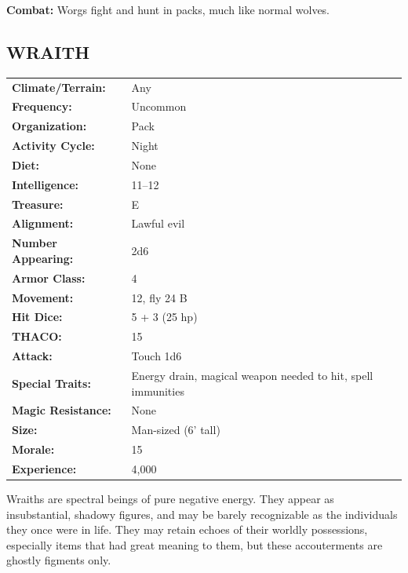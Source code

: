 \begin{multicols}{2}
\textbf{Combat:} Worgs fight and hunt in packs, much like normal wolves.

\noindent
\begin{minipage}{\columnwidth}

\vspace{1em}

\subsection{WRAITH}

\noindent \begin{tabular}{p{}p{}}
\textbf{Climate/Terrain:}	& Any	\\
\textbf{Frequency:} 		& Uncommon	\\
\textbf{Organization:} 		& Pack	\\
\textbf{Activity Cycle:} 	& Night	\\
\textbf{Diet:} 				& None	\\
\textbf{Intelligence:} 		& 11--12	\\
\textbf{Treasure:} 			& E	\\
\textbf{Alignment:} 		& Lawful evil	\\
\hline
\textbf{Number Appearing:} 	& 2d6	\\
\textbf{Armor Class:} 		& 4	\\
\textbf{Movement:} 			& 12, fly 24 B	\\
\textbf{Hit Dice:} 			& 5 + 3 (25 hp)	\\
\textbf{THACO:} 			& 15	\\
\textbf{Attack:} 			& Touch 1d6	\\
\textbf{Special Traits:} & Energy drain, magical weapon needed to hit, spell immunities	\\
\textbf{Magic Resistance:} 	& None	\\
\textbf{Size:} 				& Man-sized (6' tall)	\\
\textbf{Morale:} 			& 15	\\
\textbf{Experience:} 		& 4,000	\\ %
\end{tabular}

\end{minipage}

Wraiths are spectral beings of pure negative energy. They appear as insubstantial, shadowy figures, and may be barely recognizable as the individuals they once were in life. They may retain echoes of their worldly possessions, especially items that had great meaning to them, but these accouterments are ghostly figments only.


\end{multicols}
